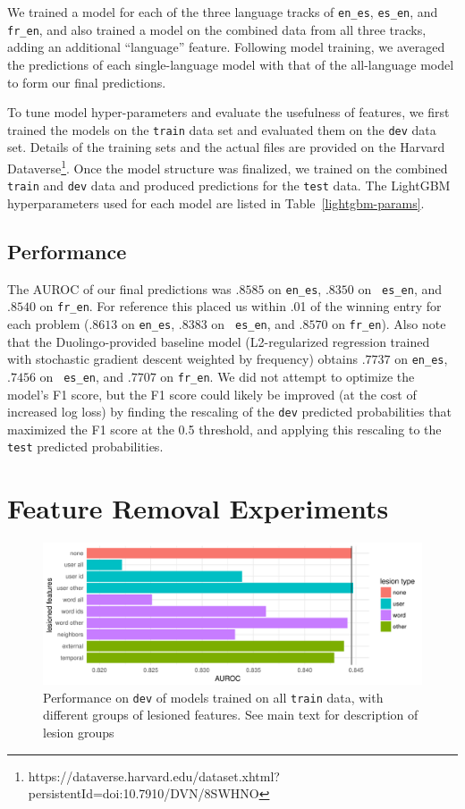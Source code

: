 \documentclass[11pt,a4paper]{article}
\begin{document}
We trained a model for each of the three language tracks of {\tt en\_es}, {\tt es\_en},
and {\tt fr\_en}, and also trained a model on the combined data from
all three tracks, adding an additional ``language'' feature. Following model
training, we averaged the predictions of each single-language model with that of
the all-language model to form our final predictions.

To tune model hyper-parameters and evaluate the usefulness of features, we first
trained the models on the {\tt train} data set and evaluated them on the {\tt dev}
data set. Details of the training sets and the actual files are provided on the
Harvard Dataverse\footnote{https://dataverse.harvard.edu/dataset.xhtml?persistentId=doi:10.7910/DVN/8SWHNO}.
Once the model structure was finalized, we trained on the combined
{\tt train} and {\tt dev} data and produced predictions for the {\tt test} data. The
LightGBM hyperparameters used for each model are listed in Table~\ref{lightgbm-params}.



\subsection{Performance}

The AUROC of our final predictions was $.8585$ on {\tt en\_es}, $.8350$ on {\tt
  es\_en}, and $.8540$ on {\tt fr\_en}. For reference this placed us within .01 of the winning
  entry for each problem ($.8613$ on {\tt en\_es}, $.8383$ on {\tt
  es\_en}, and $.8570$ on {\tt fr\_en}).  Also note that the Duolingo-provided baseline
  model (L2-regularized regression trained with stochastic gradient descent weighted
  by frequency) obtains $.7737$ on {\tt en\_es}, $.7456$ on {\tt
  es\_en}, and $.7707$ on {\tt fr\_en}.
  We did not attempt to optimize the model's
F1 score, but the F1 score could likely be improved (at the cost of
increased log loss) by finding the
rescaling of the {\tt dev} predicted probabilities that maximized the F1 score at
the 0.5 threshold, and applying this rescaling to the {\tt test} predicted probabilities.

\section{Feature Removal Experiments}

\begin{figure}[htp]
\includegraphics[width=\textwidth]{lesions.pdf}
\caption{Performance on {\tt dev} of models trained on all {\tt train} data,
  with different groups of lesioned features. See main text for description of
  lesion groups}
\label{fig:lesions}
\end{figure}
\end{document}
